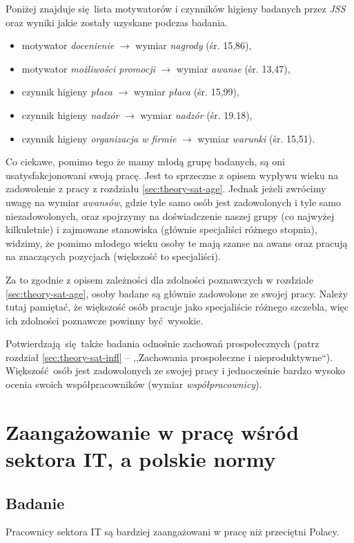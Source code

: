 Poniżej znajduje się lista motywatorów i czynników higieny badanych przez \emph{JSS} oraz wyniki jakie zostały uzyskane podczas badania.

\begin{itemize}
  \item motywator \textit{docenienie} $\rightarrow$ wymiar \textit{nagrody} (śr. 15,86),
  \item motywator \textit{możliwości promocji} $\rightarrow$ wymiar \textit{awanse} (śr. 13,47),
  \item czynnik higieny \textit{płaca} $\rightarrow$ wymiar \textit{płaca} (śr. 15,99),
  \item czynnik higieny \textit{nadzór} $\rightarrow$ wymiar \textit{nadzór} (śr. 19.18),
  \item czynnik higieny \textit{organizacja w firmie} $\rightarrow$ wymiar \textit{warunki} (śr. 15,51).
\end{itemize}

Co ciekawe, pomimo tego że mamy młodą grupę badanych, są oni usatysfakcjonowani swoją pracę. Jest to sprzeczne z opisem wypływu wieku na zadowolenie z pracy z rozdziału \ref{sec:theory-sat-age}. Jednak jeżeli zwrócimy uwagę na wymiar \textit{awansów}, gdzie tyle samo osób jest zadowolonych i tyle samo niezadowolonych, oraz spojrzymy na doświadczenie naszej grupy (co najwyżej kilkuletnie) i zajmowane stanowiska (głównie specjaliści różnego stopnia), widzimy, że pomimo młodego wieku
osoby te mają szanse na awans oraz pracują na znaczących pozycjach (większość to specjaliści).

Za to zgodnie z opisem zależności dla zdolności poznawczych w rozdziale \ref{sec:theory-sat-age}, osoby badane są głównie zadowolone ze swojej pracy. Należy tutaj pamiętać, że większość osób pracuje jako specjaliście różnego szczebla, więc ich zdolności poznawcze powinny być wysokie.

Potwierdzają się także badania odnośnie zachowań prospołecznych (patrz rozdział \ref{sec:theory-sat-infl} -- ,,Zachowania prospołeczne i nieproduktywne``). Większość osób jest zadowolonych ze swojej pracy i jednocześnie bardzo wysoko ocenia swoich współpracowników (wymiar \textit{współpracownicy}).
\section{Zaangażowanie w pracę wśród sektora IT, a polskie normy}
\subsection{Badanie}
\begin{hyp}
  Pracownicy sektora IT są bardziej zaangażowani w pracę niż przeciętni Polacy.
  \label{hip:eng}
\end{hyp}

